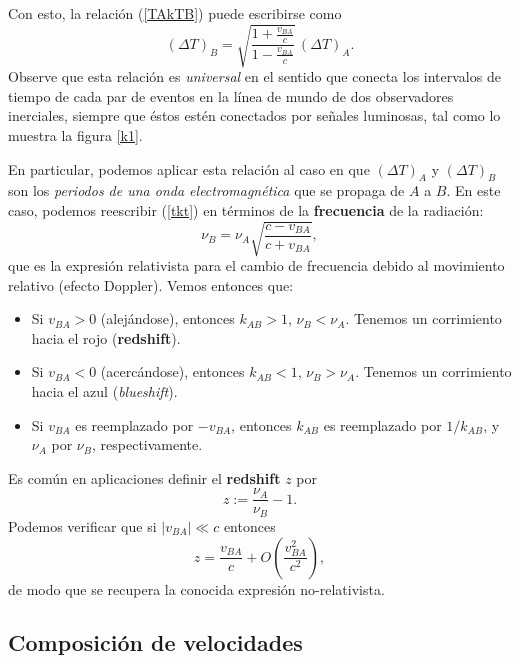 Con esto, la relación (\ref{TAkTB}) puede escribirse como
\begin{equation}
(\Delta T)_B=\sqrt{\frac{1+\frac{v_{BA}}{c}}{1-\frac{v_{BA}}{c}}}
\,(\Delta T)_A. \label{k2}
\end{equation}
Observe que esta relación es \textit{universal} en el sentido que conecta los intervalos de tiempo de cada par de eventos en la línea de mundo de dos observadores inerciales, siempre que éstos estén conectados por señales luminosas, tal como lo muestra la figura \ref{k1}.

En particular, podemos aplicar esta relación al caso en que $(\Delta T)_A$ y
$(\Delta T)_B$ son los \textit{periodos de una onda electromagnética} que se propaga de $A$ a $B$. En este caso, podemos reescribir (\ref{tkt}) en términos de la \textbf{frecuencia} de la radiación:
\begin{equation}
\nu_B=\nu_A\sqrt{\frac{c-v_{BA}}{c+v_{BA}}},
\end{equation}
que es la expresión relativista para el cambio de frecuencia debido al movimiento relativo (efecto Doppler). Vemos entonces que:
\begin{itemize}
\item Si $v_{BA}>0$ (alejándose), entonces $k_{AB}>1$, $\nu_B <
\nu_A$.
Tenemos un corrimiento hacia el rojo (\textbf{redshift}).
\item Si $v_{BA}<0$ (acercándose), entonces $k_{AB}<1$, $\nu_B >
\nu_A$.
Tenemos un corrimiento hacia el azul (\textit{blueshift}).
\item Si $v_{BA}$ es reemplazado por $-v_{BA}$, entonces $k_{AB}$ es reemplazado
por $1/{k_{AB}}$, y $\nu_A$ por $\nu_B$, respectivamente.
\end{itemize}
Es común en aplicaciones definir el \textbf{redshift} $z$ por
\begin{equation}
z:=\frac{\nu_A}{\nu_B}-1.
\end{equation}
Podemos verificar que si $|v_{BA}|\ll c$ entonces 
\begin{equation}
z=\frac{v_{BA}}{c}+O(\frac{v_{BA}^2}{c^2}),
\end{equation}
de modo que se recupera la conocida expresión no-relativista.

\subsection{Composición de velocidades}

